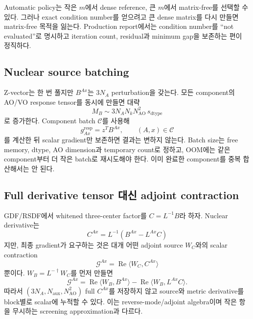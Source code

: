 Automatic policy는 작은 $m$에서 dense reference, 큰 $m$에서 matrix-free를 선택할 수
있다. 그러나 exact condition number를 얻으려고 큰 dense matrix를 다시 만들면 matrix-free
목적을 잃는다. Production report에서는 condition number를 ``not evaluated''로 명시하고
iteration count, residual과 minimum gap을 보존하는 편이 정직하다.

\subsection{Nuclear source batching}

Z-vector는 한 번 풀지만 $B^{Ax}$는 $3N_A$ perturbation을 갖는다. 모든 component의
AO/VO response tensor를 동시에 만들면 대략
\begin{equation}
  M_B\sim 3N_A N_kN_{\mathrm{AO}}^2\,s_{\mathrm{dtype}}
  \label{eq:nuclear-batch}
\end{equation}
로 증가한다. Component batch $\mathcal C$를 사용해
\begin{equation}
  g_{Ax}^{\mathrm{resp}}=z^TB^{Ax},\qquad (A,x)\in\mathcal C
\end{equation}
를 계산한 뒤 scalar gradient만 보존하면 결과는 변하지 않는다. Batch size는 free memory,
dtype, AO dimension과 temporary count로 정하고, OOM에는 같은 component부터 더 작은
batch로 재시도해야 한다. 이미 완료한 component를 중복 합산해서는 안 된다.

\subsection{Full derivative tensor 대신 adjoint contraction}

GDF/RSDF에서 whitened three-center factor를 $C=L^{-1}B$라 하자. Nuclear derivative는
\begin{equation}
  C^{Ax}=L^{-1}\left(B^{Ax}-L^{Ax}C\right)
  \label{eq:bounded-cderi-derivative}
\end{equation}
지만, 최종 gradient가 요구하는 것은 대개 어떤 adjoint source $W_C$와의 scalar
contraction
\begin{equation}
  \mathcal G^{Ax}=\operatorname{Re}\langle W_C,C^{Ax}\rangle
  \label{eq:reverse-contraction}
\end{equation}
뿐이다. $W_B=L^{-\dagger}W_C$를 먼저 만들면
\begin{equation}
  \mathcal G^{Ax}
  =\operatorname{Re}\langle W_B,B^{Ax}\rangle
   -\operatorname{Re}\langle W_B,L^{Ax}C\rangle.
  \label{eq:reverse-cderi-response}
\end{equation}
따라서 $(3N_A,N_{\mathrm{aux}},N_{\mathrm{AO}}^2)$ full $C^{Ax}$를 저장하지 않고 source와
metric derivative를 block별로 scalar에 누적할 수 있다. 이는 reverse-mode/adjoint
algebra이며 작은 항을 무시하는 screening approximation과 다르다.


